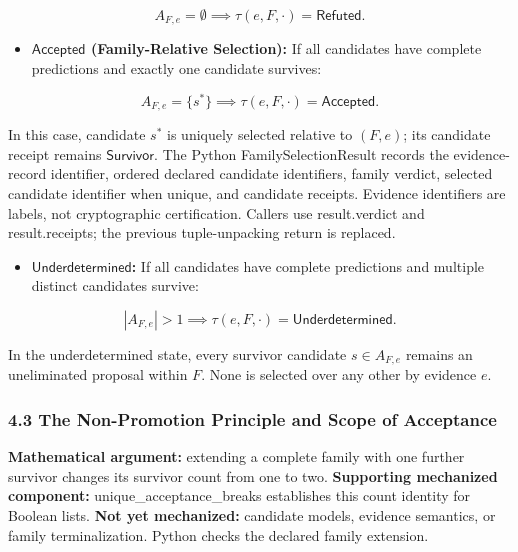\documentclass[
  10pt,
]{article}
\providecommand{\tightlist}{%
  \setlength{\itemsep}{0pt}\setlength{\parskip}{0pt}}
\providecommand{\tightlist}{%
  \setlength{\itemsep}{0pt}\setlength{\parskip}{0pt}}
\begin{document}
\hypertarget{math-E0163-0220}{}{\[A_{F,e} = \emptyset \implies \tau(e, F, \cdot) = \mathsf{Refuted}.\]}

\begin{itemize}
\tightlist
\item
  \textbf{\hypertarget{math-E0164-0221}{}{\(\mathsf{Accepted}\)} (Family-Relative Selection):} If all candidates have complete predictions and exactly one candidate survives:
\end{itemize}

\hypertarget{math-E0165-0222}{}{\[A_{F,e} = \{s^*\} \implies \tau(e, F, \cdot) = \mathsf{Accepted}.\]}

In this case, candidate \hypertarget{math-E0166-0223}{}{\(s^*\)} is uniquely selected relative to \hypertarget{math-E0167-0224}{}{\((F,e)\)}; its candidate receipt remains \hypertarget{math-E0154-0225}{}{\(\mathsf{Survivor}\)}. The Python FamilySelectionResult records the evidence-record identifier, ordered declared candidate identifiers, family verdict, selected candidate identifier when unique, and candidate receipts. Evidence identifiers are labels, not cryptographic certification. Callers use result.verdict and result.receipts; the previous tuple-unpacking return is replaced.

\begin{itemize}
\tightlist
\item
  \textbf{\hypertarget{math-E0168-0226}{}{\(\mathsf{Underdetermined}\)}:} If all candidates have complete predictions and multiple distinct candidates survive:
\end{itemize}

\hypertarget{math-E0169-0227}{}{\[|A_{F,e}| > 1 \implies \tau(e, F, \cdot) = \mathsf{Underdetermined}.\]}

In the underdetermined state, every survivor candidate \hypertarget{math-E0170-0228}{}{\(s \in A_{F,e}\)} remains an uneliminated proposal within \hypertarget{math-E0005-0229}{}{\(F\)}. None is selected over any other by evidence \hypertarget{math-E0006-0230}{}{\(e\)}.

\subsubsection{4.3 The Non-Promotion Principle and Scope of Acceptance}\label{the-non-promotion-principle-and-scope-of-acceptance}

\textbf{Mathematical argument:} extending a complete family with one further survivor changes its survivor count from one to two. \textbf{Supporting mechanized component:} unique\_acceptance\_breaks establishes this count identity for Boolean lists. \textbf{Not yet mechanized:} candidate models, evidence semantics, or family terminalization. Python checks the declared family extension.
\end{document}
